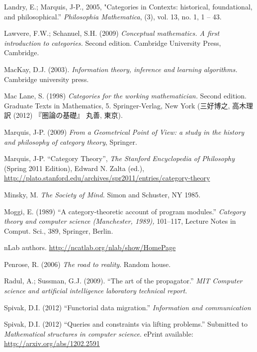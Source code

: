 \begin{thebibliography}{SGWB}
 Landry, E.; Marquis, J-P., 2005, "Categories in Contexts: historical, foundational, and philosophical.'' \textit{Philosophia Mathematica}, (3), vol. 13, no. 1, 1 -- 43.

 Lawvere, F.W.; Schanuel, S.H. (2009) \textit{Conceptual mathematics. 
A first introduction to categories.} Second edition. Cambridge University Press, Cambridge.

 MacKay, D.J. (2003). \textit{Information theory, inference and learning algorithms.} Cambridge university press.

 Mac Lane, S. (1998) \textit{Categories for the working mathematician.} Second edition. Graduate Texts in Mathematics, 5. Springer-Verlag, New York (三好博之, 高木理 訳 (2012) 『圏論の基礎』 丸善, 東京).

 Marquis, J-P. (2009) \textit{From a Geometrical Point of View: a study in the history and philosophy of category theory}, Springer.

 Marquis, J-P. ``Category Theory'', \textit{The Stanford Encyclopedia of Philosophy} (Spring 2011 Edition), Edward N. Zalta (ed.), \url{http://plato.stanford.edu/archives/spr2011/entries/category-theory}

 Minsky, M. \textit{The Society of Mind.}  Simon and Schuster, NY 1985.

 Moggi, E. (1989) ``A category-theoretic account of program modules.'' \textit{Category theory and computer science (Manchester, 1989),} 101--117, Lecture Notes in Comput. Sci., 389, Springer, Berlin. 

 nLab authors.  \url{http://ncatlab.org/nlab/show/HomePage}

 Penrose, R. (2006) \textit{The road to reality}. Random house.

 Radul, A.; Sussman, G.J. (2009). ``The art of the propagator.'' \textit{MIT Computer science and artificial intelligence laboratory technical report.}

 Spivak, D.I. (2012) ``Functorial data migration.'' \textit{Information and communication} 

 Spivak, D.I. (2012) ``Queries and constraints via lifting problems.'' Submitted to \textit{Mathematical structures in computer science}. ePrint available: \url{http://arxiv.org/abs/1202.2591}


\end{thebibliography}
